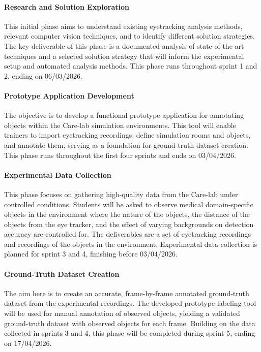 \documentclass[english]{hogent-article}
\begin{document}
\paragraph{Research and Solution Exploration\\}
This initial phase aims to understand existing eyetracking analysis methods, 
relevant computer vision techniques, and to identify different solution strategies. 
The key deliverable of this phase is a documented analysis of state-of-the-art techniques and a selected solution strategy 
that will inform the experimental setup and automated analysis methods.
This phase runs throughout sprint 1 and 2, ending on 06/03/2026.

\paragraph{Prototype Application Development\\}
The objective is to develop a functional prototype application for annotating objects within the Care-lab simulation environments.
This tool will enable trainers to import eyetracking recordings, define simulation rooms and objects, and annotate them, 
serving as a foundation for ground-truth dataset creation.
This phase runs throughout the first four sprints and ends on 03/04/2026.


\paragraph{Experimental Data Collection\\}
This phase focuses on gathering high-quality data from the Care-lab under controlled conditions. 
Students will be asked to observe medical domain-specific objects in the environment where the nature of the objects, 
the distance of the objects from the eye tracker, and the effect of varying backgrounds on detection accuracy are controlled for.
The deliverables are a set of eyetracking recordings and recordings of the objects in the environment.
Experimental data collection is planned for sprint 3 and 4, finishing before 03/04/2026.

\paragraph{Ground-Truth Dataset Creation\\}
The aim here is to create an accurate, frame-by-frame annotated ground-truth dataset from the experimental recordings. 
The developed prototype labeling tool will be used for manual annotation of observed objects, 
yielding a validated ground-truth dataset with observed objects for each frame.
Building on the data collected in sprints 3 and 4, this phase will be completed during sprint 5, ending on 17/04/2026.
\end{document}
